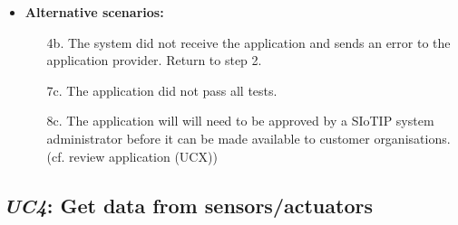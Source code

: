 \begin{itemize}
    \item \textbf{Alternative scenarios:}
    \begin{enumerate}
        \item [4b.] The system did not receive the application and sends an error
                    to the application provider. Return to step 2.
        \item [7c.] The application did not pass all tests.
        \item [8c.] The application will will need to be approved by a SIoTIP
                    system administrator before it can be made available to
                    customer organisations. (cf. review application (UCX))
    \end{enumerate}
\end{itemize}

\subsection{\emph{UC4}: Get data from sensors/actuators}
